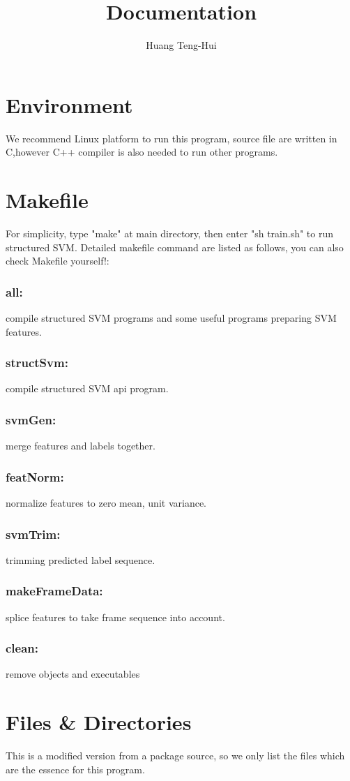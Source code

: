 \documentclass[10pt,a4paper]{article}
\author{Huang Teng-Hui}
\title{Documentation}
\begin{document}
\section{Environment}
We recommend Linux platform to run this program, source file are written in C,however C++ compiler is also needed to run other programs.
\section{Makefile}
For simplicity, type "make" at main directory, then enter "sh train.sh" to run structured SVM.
Detailed makefile command are listed as follows, you can also check Makefile yourself!:
\subsubsection*{all:}
 compile structured SVM programs and some useful programs preparing SVM features.
\subsubsection*{structSvm:}
 compile structured SVM api program.
\subsubsection*{svmGen:}
 merge features and labels together. 
\subsubsection*{featNorm:}
 normalize features to zero mean, unit variance.
\subsubsection*{svmTrim:}
 trimming predicted label sequence.
\subsubsection*{makeFrameData:}
 splice features to take frame sequence into account.
\subsubsection*{clean:}
 remove objects and executables
\section{Files \& Directories}
This is a modified version from a package source, so we only list the files which are the essence for this program.  
\end{document}
